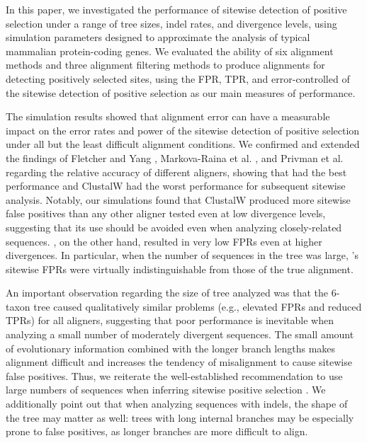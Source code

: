\documentclass{article}
\begin{document}
In this paper, we investigated the performance of sitewise detection
of positive selection under a range of tree sizes, indel rates, and
divergence levels, using simulation parameters designed to approximate
the analysis of typical mammalian protein-coding genes. We
evaluated the ability of six alignment methods and three alignment
filtering methods to produce alignments for detecting positively
selected sites, using the FPR, TPR, and error-controlled \tpr of the
sitewise detection of positive selection as our main measures of
performance.

The simulation results showed that alignment error can have a
measurable impact on the error rates and power of the sitewise
detection of positive selection under all but the least difficult
alignment conditions. We confirmed and extended the findings of
Fletcher and Yang \citeyearpar{Fletcher2010Effect}, Markova-Raina et
al. \citeyearpar{Markova-Raina2011High}, and Privman et
al. \citeyearpar{Privman2011Improving} regarding the relative accuracy
of different aligners, showing that \prankc had the best performance
and ClustalW had the worst performance for subsequent sitewise
analysis. Notably, our simulations found that ClustalW produced more
sitewise false positives than any other aligner tested even at low
divergence levels, suggesting that its use should be avoided even when
analyzing closely-related sequences. \prankc, on the other hand,
resulted in very low FPRs even at higher divergences. In particular, when the
number of sequences in the tree was large, \prankc{}'s sitewise FPRs
were virtually indistinguishable from those of the true alignment.

An important observation regarding the size of tree analyzed was that
the 6-taxon tree caused qualitatively similar problems (e.g., elevated
FPRs and reduced TPRs) for all aligners, suggesting that poor
performance is inevitable when analyzing a small number of moderately
divergent sequences. The small amount of evolutionary information
combined with the longer branch lengths makes alignment difficult and
increases the tendency of misalignment to cause sitewise false
positives. Thus, we reiterate the well-established recommendation to
use large numbers of sequences when inferring sitewise positive
selection \citep{Anisimova2001Accuracy,Anisimova2002Accuracy}. We
additionally point out that when analyzing sequences with indels, the
shape of the tree may matter as well: trees with long internal
branches may be especially prone to false positives, as longer
branches are more difficult to align.
\end{document}
